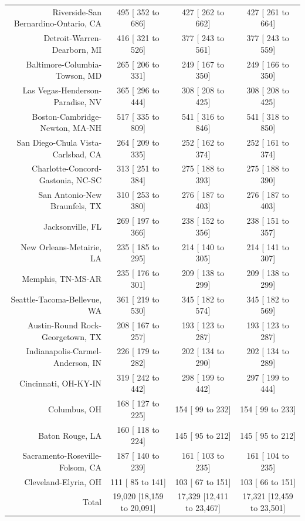 \documentclass{article}
\begin{document}
\begin{table}[H]
\begin{tabular}{|r|c|c|c|}
		Riverside-San Bernardino-Ontario, CA &    495 [   352 to    686] &    427 [   262 to    662] &    427 [   261 to    664]\\
		Detroit-Warren-Dearborn, MI &    416 [   321 to    526] &    377 [   243 to    561] &    377 [   243 to    559]\\
		Baltimore-Columbia-Towson, MD &    265 [   206 to    331] &    249 [   167 to    350] &    249 [   166 to    350]\\
		Las Vegas-Henderson-Paradise, NV &    365 [   296 to    444] &    308 [   208 to    425] &    308 [   208 to    425]\\
		Boston-Cambridge-Newton, MA-NH &    517 [   335 to    809] &    541 [   316 to    846] &    541 [   318 to    850]\\
		San Diego-Chula Vista-Carlsbad, CA &    264 [   209 to    335] &    252 [   162 to    374] &    252 [   161 to    374]\\
		Charlotte-Concord-Gastonia, NC-SC &    313 [   251 to    384] &    275 [   188 to    393] &    275 [   188 to    390]\\
		San Antonio-New Braunfels, TX &    310 [   253 to    380] &    276 [   187 to    403] &    276 [   187 to    403]\\
		Jacksonville, FL &    269 [   197 to    366] &    238 [   152 to    356] &    238 [   151 to    357]\\
		New Orleans-Metairie, LA &    235 [   185 to    295] &    214 [   140 to    305] &    214 [   141 to    307]\\
		Memphis, TN-MS-AR &    235 [   176 to    301] &    209 [   138 to    299] &    209 [   138 to    299]\\
		Seattle-Tacoma-Bellevue, WA &    361 [   219 to    530] &    345 [   182 to    574] &    345 [   182 to    569]\\
		Austin-Round Rock-Georgetown, TX &    208 [   167 to    257] &    193 [   123 to    287] &    193 [   123 to    287]\\
		Indianapolis-Carmel-Anderson, IN &    226 [   179 to    282] &    202 [   134 to    290] &    202 [   134 to    289]\\
		Cincinnati, OH-KY-IN &    319 [   242 to    442] &    298 [   199 to    442] &    297 [   199 to    444]\\
		Columbus, OH &    168 [   127 to    225] &    154 [    99 to    232] &    154 [    99 to    233]\\
		Baton Rouge, LA &    160 [   118 to    224] &    145 [    95 to    212] &    145 [    95 to    212]\\
		Sacramento-Roseville-Folsom, CA &    187 [   140 to    239] &    161 [   103 to    235] &    161 [   104 to    235]\\
		Cleveland-Elyria, OH &    111 [    85 to    141] &    103 [    67 to    151] &    103 [    66 to    151]\\
		\hline
		Total & 19,020 [18,159 to 20,091] & 17,329 [12,411 to 23,467] & 17,321 [12,459 to 23,501]\\
		\hline
	\end{tabular}
\end{table}
\end{document}

